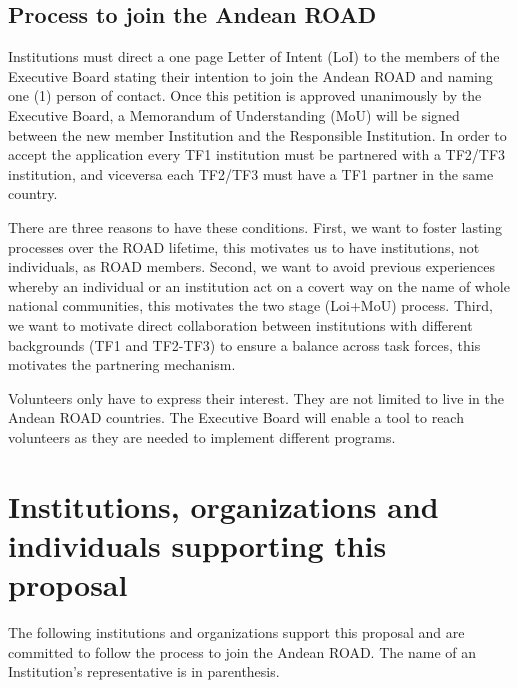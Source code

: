 \documentclass[12pt]{article}
\begin{document}
\subsection*{Process to join the Andean ROAD}

Institutions must direct a one page Letter of Intent (LoI) to the
members of the Executive Board stating their intention to join the
Andean ROAD and naming one (1) person of contact. Once this petition
is approved unanimously by the Executive Board, a Memorandum of
Understanding (MoU) will be signed between the new member Institution
and the Responsible Institution. In order to accept the application
every TF1 institution must be partnered with a TF2/TF3 institution,
and viceversa each TF2/TF3 must have a TF1 partner in the same
country. 

There are three reasons to have these conditions. First, we want to
foster lasting processes over the ROAD lifetime, this motivates us to
have institutions, not individuals, as ROAD members. Second, we want
to avoid previous experiences whereby an individual or an institution
act on a covert way on the name of whole national communities, this
motivates the two stage (Loi+MoU) process. Third, we want to motivate
direct collaboration between institutions with different backgrounds
(TF1 and TF2-TF3) to ensure a balance across task forces, this
motivates the partnering mechanism.  

Volunteers only have to express their interest. They are not limited
to live in the Andean ROAD countries. The Executive Board will enable
a tool to reach volunteers as they are needed to implement different
programs.  


\appendixpage
\appendix
\section{Institutions, organizations and individuals supporting this proposal}

The following institutions and organizations support this proposal and
are committed to follow the process to join the Andean ROAD. The name
of an Institution’s representative is in parenthesis. 
\end{document}
